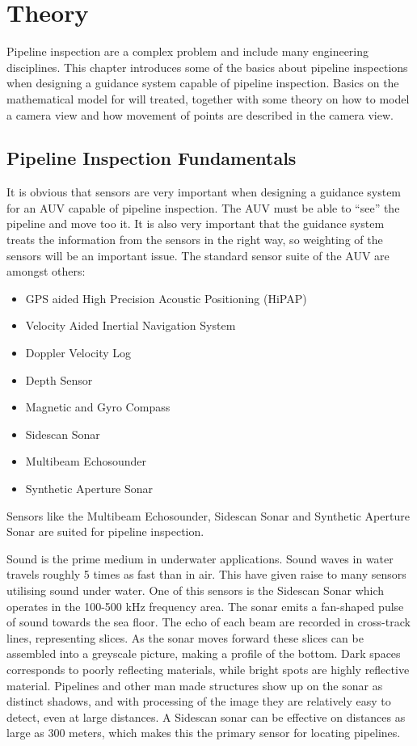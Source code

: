 \chapter{Theory}
	Pipeline inspection are a complex problem and include many engineering disciplines.
	This chapter introduces some of the basics about pipeline inspections when
	designing a guidance system capable of pipeline inspection. Basics on the mathematical model for
	\hugin will treated, together with some theory on how to model a camera view and how
	movement of points are described in the camera view.

\section{Pipeline Inspection Fundamentals}
	It is obvious that sensors are very important when designing a guidance system for an AUV capable of
	pipeline inspection. The AUV must be able to ``see'' the pipeline and move too it. It is also very
	important that the guidance system treats the information from the sensors in the right way, so
	weighting of the sensors will be an important issue. The standard sensor suite of the \hugin
	AUV are amongst	others\cite{Bjorn_gjelstad_talk}:
		\begin{itemize}
			\item GPS aided High Precision Acoustic Positioning (HiPAP)
			\item Velocity Aided Inertial Navigation System
			\item Doppler Velocity Log
			\item Depth Sensor
			\item Magnetic and Gyro Compass
			\item Sidescan Sonar
			\item Multibeam Echosounder
			\item Synthetic Aperture Sonar
		\end{itemize}
	Sensors like the Multibeam Echosounder, Sidescan Sonar and Synthetic Aperture Sonar are suited
	for pipeline inspection.

	Sound is the prime medium in underwater applications. Sound waves in water travels roughly 5 times as
	fast than in air. This have given raise to many sensors utilising sound under water. One of this
	sensors is the Sidescan Sonar which operates in the 100-500 kHz frequency area. The sonar emits a
	fan-shaped pulse of sound towards the sea floor. The echo of each beam are recorded in cross-track
	lines, representing slices. As the sonar moves forward these slices can be
	assembled into a greyscale picture, making a profile of the bottom. Dark spaces corresponds to poorly 
	reflecting materials, while bright spots are highly reflective material. Pipelines and other man made
	structures show up on the
	sonar as distinct shadows, and with processing of the image they are relatively easy to detect,
	even at large distances. A Sidescan sonar can be effective on distances as large as 300 meters, which
	makes this the primary sensor for locating pipelines.\cite{sidescan-sonar} \cite{side_scan_sonar}

